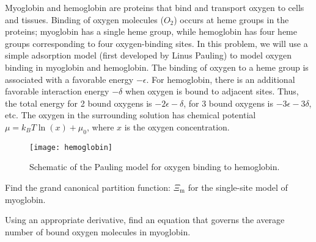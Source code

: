 \bigskip
{}
Myoglobin and hemoglobin are proteins that bind and
transport oxygen to cells and tissues.
Binding of oxygen molecules ($O_2$) occurs at heme groups
in the proteins; myoglobin has a single heme group, 
while hemoglobin has four heme groups corresponding
to four oxygen-binding sites.
In this problem, we will use a simple adsorption model 
(first developed by Linus Pauling)
to model oxygen binding in myoglobin and hemoglobin.
The binding of oxygen to a heme group is associated with 
a favorable energy $-\epsilon$.
For hemoglobin,
there is an additional favorable interaction energy $-\delta$ when
oxygen is bound to adjacent sites.  Thus, the total energy for
2 bound oxygens is $-2 \epsilon - \delta$, 
for 3 bound oxygens is $-3 \epsilon - 3 \delta$, etc.
The oxygen in the surrounding solution
has chemical potential $\mu = k_{B}T \ln(x) +\mu_{0}$, 
where $x$ is the oxygen concentration.

\begin{figure}[h]\centering
\texttt{[image: hemoglobin]}
\caption{\label{fig:hemoglobin}
Schematic of the Pauling model for oxygen binding to hemoglobin.}
\end{figure}

\smallskip\subp
Find the grand canonical partition function:
$\Xi_\text{m}$ for the single-site model of myoglobin.

\smallskip\subp
Using an appropriate derivative, find an equation that governs
the average number of bound oxygen molecules in myoglobin.

